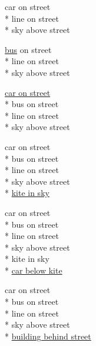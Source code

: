 \documentclass[10pt,twocolumn,letterpaper]{article}
\begin{document}
\newlength{\progsize}
\setlength{\progsize}{0.1335\textwidth}
\begin{figure*}[ht]
  \centering
  \begin{minipage}{\progsize}
    \centering
    \scriptsize
    car on street \\*
    line on street \\*
    sky above street
  \end{minipage}
  \begin{minipage}{\progsize}
    \centering
    \scriptsize
    \underline{bus} on street \\*
    line on street \\*
    sky above street
  \end{minipage}
  \begin{minipage}{\progsize}
    \centering
    \scriptsize
    \underline{car on street} \\*
    bus on street \\*
    line on street \\*
    sky above street
  \end{minipage}
  \begin{minipage}{\progsize}
    \centering
    \scriptsize
    car on street \\*
    bus on street \\*
    line on street \\*
    sky above street \\*
    \underline{kite in sky}
  \end{minipage}
  \begin{minipage}{\progsize}
    \centering
    \ssmall
    car on street \\*
    bus on street \\*
    line on street \\*
    sky above street \\*
    kite in sky \\*
    \underline{car below kite}
  \end{minipage}
  \begin{minipage}{\progsize}
    \centering
    \ssmall
    car on street \\*
    bus on street \\*
    line on street \\*
    sky above street \\*
    \underline{building behind street}
  \end{minipage}
  \begin{minipage}{\progsize}
    \centering
    \ssmall

\end{minipage}
\end{figure*}
\end{document}
